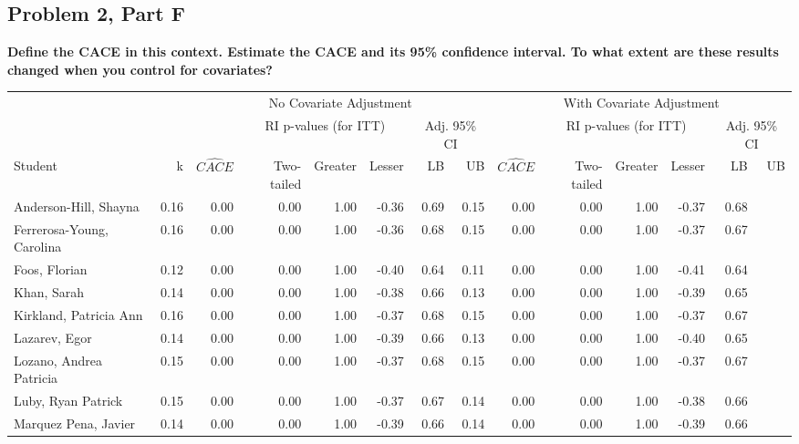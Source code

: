 \documentclass[11pt,notitlepage]{article}
\begin{document}
\clearpage

\subsection{Problem 2, Part F} {\bf Define the CACE in this context.  Estimate the CACE and its 95\% confidence interval.  To what extent are these results changed when you control for covariates?}

\vspace{1cm}

\begin{table}[h!]\scriptsize\onehalfspacing
\begin{center}
\begin{tabular}{lrrrrrrr|rrrrrr}
  \hline
  & & \multicolumn{6}{c|}{No Covariate Adjustment} & \multicolumn{6}{c}{With Covariate Adjustment} \\
  \cline{3-14}
  & & & \multicolumn{3}{c}{RI p-values (for ITT)} & \multicolumn{2}{c|}{Adj. 95\% CI} &  & \multicolumn{3}{c}{RI p-values (for ITT)} & \multicolumn{2}{c}{Adj. 95\% CI} \\
  \cline{4-6}\cline{10-12}
Student & k & $\widehat{CACE}$ & Two-tailed & Greater & Lesser & LB & UB & $\widehat{CACE}$ & Two-tailed & Greater & Lesser & LB & UB \\ 
  \hline
Anderson-Hill, Shayna & 0.16 & 0.00 & 0.00 & 1.00 & -0.36 & 0.69 & 0.15 & 0.00 & 0.00 & 1.00 & -0.37 & 0.68 &  \\ 
  Ferrerosa-Young, Carolina & 0.16 & 0.00 & 0.00 & 1.00 & -0.36 & 0.68 & 0.15 & 0.00 & 0.00 & 1.00 & -0.37 & 0.67 &  \\ 
  Foos, Florian & 0.12 & 0.00 & 0.00 & 1.00 & -0.40 & 0.64 & 0.11 & 0.00 & 0.00 & 1.00 & -0.41 & 0.64 &  \\ 
  Khan, Sarah & 0.14 & 0.00 & 0.00 & 1.00 & -0.38 & 0.66 & 0.13 & 0.00 & 0.00 & 1.00 & -0.39 & 0.65 &  \\ 
  Kirkland, Patricia Ann & 0.16 & 0.00 & 0.00 & 1.00 & -0.37 & 0.68 & 0.15 & 0.00 & 0.00 & 1.00 & -0.37 & 0.67 &  \\ 
  Lazarev, Egor & 0.14 & 0.00 & 0.00 & 1.00 & -0.39 & 0.66 & 0.13 & 0.00 & 0.00 & 1.00 & -0.40 & 0.65 &  \\ 
  Lozano, Andrea Patricia & 0.15 & 0.00 & 0.00 & 1.00 & -0.37 & 0.68 & 0.15 & 0.00 & 0.00 & 1.00 & -0.37 & 0.67 &  \\ 
  Luby, Ryan Patrick & 0.15 & 0.00 & 0.00 & 1.00 & -0.37 & 0.67 & 0.14 & 0.00 & 0.00 & 1.00 & -0.38 & 0.66 &  \\ 
  Marquez Pena, Javier & 0.14 & 0.00 & 0.00 & 1.00 & -0.39 & 0.66 & 0.14 & 0.00 & 0.00 & 1.00 & -0.39 & 0.66 &  \\ 

\end{tabular}
\end{center}
\end{table}
\end{document}
